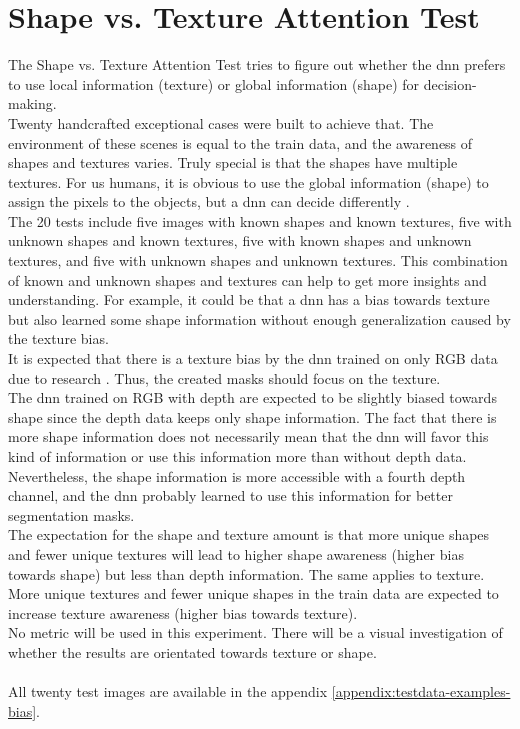 	\section{Shape vs. Texture Attention Test}
	\label{sec:shape-texutre-attention-test}
		The Shape vs. Texture Attention Test tries to figure out whether the \ac{dnn} prefers to use local information (texture) or global information (shape) for decision-making.\\
		Twenty handcrafted exceptional cases were built to achieve that. The environment of these scenes is equal to the train data, and the awareness of shapes and textures varies. Truly special is that the shapes have multiple textures. For us humans, it is obvious to use the global information (shape) to assign the pixels to the objects, but a \ac{dnn} can decide differently \cite{Geirhos2020}\cite{Mohla2022}\cite{Baker2020}.\\
		The 20 tests include five images with known shapes and known textures, five with unknown shapes and known textures, five with known shapes and unknown textures, and five with unknown shapes and unknown textures. This combination of known and unknown shapes and textures can help to get more insights and understanding. For example, it could be that a \ac{dnn} has a bias towards texture but also learned some shape information without enough generalization caused by the texture bias.\\
		It is expected that there is a texture bias by the \ac{dnn} trained on only RGB data due to research \cite{Theodoridis2022}. Thus, the created masks should focus on the texture. \\
		The \ac{dnn} trained on RGB with depth are expected to be slightly biased towards shape since the depth data keeps only shape information. The fact that there is more shape information does not necessarily mean that the \ac{dnn} will favor this kind of information or use this information more than without depth data. Nevertheless, the shape information is more accessible with a fourth depth channel, and the \ac{dnn} probably learned to use this information for better segmentation masks.\\
		The expectation for the shape and texture amount is that more unique shapes and fewer unique textures will lead to higher shape awareness (higher bias towards shape) but less than depth information. The same applies to texture. More unique textures and fewer unique shapes in the train data are expected to increase texture awareness (higher bias towards texture). \\
		No metric will be used in this experiment. There will be a visual investigation of whether the results are orientated towards texture or shape.\\
		\\
		All twenty test images are available in the appendix \ref{appendix:testdata-examples-bias}.
	
